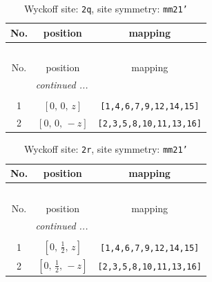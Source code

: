 \documentclass[fleqn,8pt]{jsarticle}
\begin{document}
\begin{longtable}{ccc}
\caption{Wyckoff site: {\tt 2q}, site symmetry: {\tt mm21'}}
 \\
 \hline \hline
No. & position & mapping \\ \hline \endfirsthead

\multicolumn{2}{l}{\tablename\ \thetable{}} \\
 \hline \hline
No. & position & mapping \\ \hline \endhead

 \hline \hline
\multicolumn{2}{r}{\footnotesize\it continued ...} \\ \endfoot

 \hline \hline
\multicolumn{2}{r}{} \\ \endlastfoot

1 & $\left[ 0,\, 0,\, z \right]$ & {\tt [1,4,6,7,9,12,14,15]} \\ \hline
2 & $\left[ 0,\, 0,\, - z \right]$ & {\tt [2,3,5,8,10,11,13,16]} \\
\end{longtable}
\renewcommand{\arraystretch}{1.2}
\begin{longtable}{ccc}
\caption{Wyckoff site: {\tt 2r}, site symmetry: {\tt mm21'}}
 \\
 \hline \hline
No. & position & mapping \\ \hline \endfirsthead

\multicolumn{2}{l}{\tablename\ \thetable{}} \\
 \hline \hline
No. & position & mapping \\ \hline \endhead

 \hline \hline
\multicolumn{2}{r}{\footnotesize\it continued ...} \\ \endfoot

 \hline \hline
\multicolumn{2}{r}{} \\ \endlastfoot

1 & $\left[ 0,\, \frac{1}{2},\, z \right]$ & {\tt [1,4,6,7,9,12,14,15]} \\ \hline
2 & $\left[ 0,\, \frac{1}{2},\, - z \right]$ & {\tt [2,3,5,8,10,11,13,16]} \\
\end{longtable}
\renewcommand{\arraystretch}{1.2}
\end{document}
